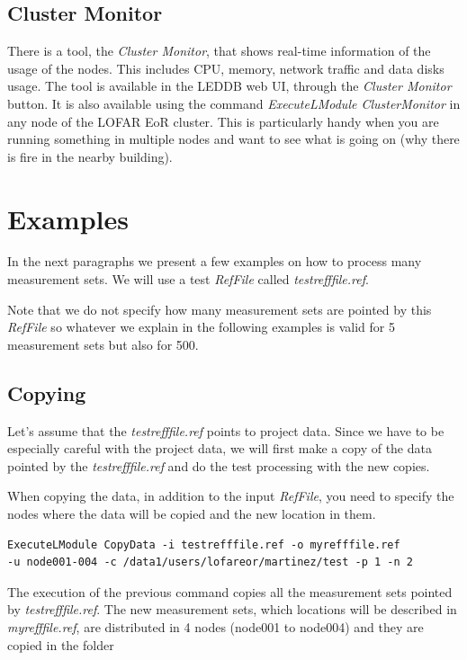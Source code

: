 \documentclass[a4paper,11pt]{article}
\begin{document}
\subsection*{Cluster Monitor}

There is a tool, the \textit{Cluster Monitor}, that shows real-time information of the usage of the nodes. This includes CPU, memory, network traffic and data disks usage. The tool is available in the LEDDB web UI, through the \textit{Cluster Monitor} button. It is also available using the command \textit{ExecuteLModule ClusterMonitor} in any node of the LOFAR EoR cluster. This is particularly handy when you are running something in multiple nodes and want to see what is going on (why there is fire in the nearby building).

\section{Examples}

In the next paragraphs we present a few examples on how to process many measurement sets. We will use a test \textit{RefFile} called \textit{testrefffile.ref}.

Note that we do not specify how many measurement sets are pointed by this \textit{RefFile} so whatever we explain in the following examples is valid for 5 measurement sets but also for 500. 

\subsection{Copying}
Let's assume that the \textit{testrefffile.ref} points to project data. Since we have to be especially careful with the project data, we will first make a copy of the data pointed by the \textit{testrefffile.ref} and do the test processing with the new copies.

When copying the data, in addition to the input \textit{RefFile}, you need to specify the nodes where the data will be copied and the new location in them.

\begin{verbatim}
ExecuteLModule CopyData -i testrefffile.ref -o myrefffile.ref
-u node001-004 -c /data1/users/lofareor/martinez/test -p 1 -n 2
\end{verbatim}

The execution of the previous command copies all the measurement sets pointed by \textit{testrefffile.ref}. The new measurement sets, which locations will be described in \textit{myrefffile.ref}, are distributed in 4 nodes (node001 to node004) and they are copied in the folder 
\end{document}
